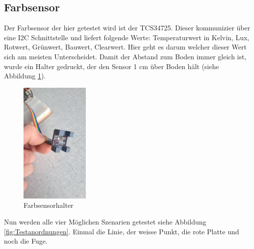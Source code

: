 \subsection{Farbsensor}
Der Farbsensor der hier getestet wird ist der TCS34725. Dieser kommunizier über eine I2C Schnittstelle und liefert folgende Werte: Temperaturwert in Kelvin, Lux, Rotwert, Grünwert, Bauwert, Clearwert. Hier geht es darum welcher dieser Wert sich am meisten Unterscheidet. Damit der Abstand zum Boden immer gleich ist, wurde ein Halter gedruckt, der den Sensor 1 cm über Boden hält (siehe Abbildung \ref{fig:Farbsensorhalter}).

\begin{figure}[h] %
    \centering
    \includegraphics[width=0.3\textwidth]{img/sensortest/FarbsensorHalter.jpg} %
    \caption{Farbsensorhalter}
    \label{fig:Farbsensorhalter} %
\end{figure}

Nun werden alle vier Möglichen Szenarien getestet siehe Abbildung \ref{fig:Testanordnungen}. Einmal die Linie, der weisse Punkt, die rote Platte und noch die Fuge.


